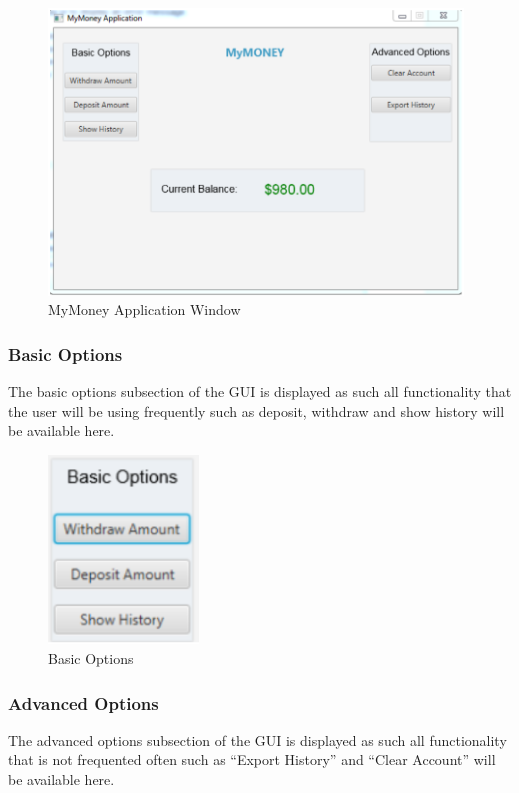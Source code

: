 \documentclass[12pt]{article}
\begin{document}
\begin{figure}[h!]
  \centering
  \includegraphics[width=110mm]{maininterface.PNG}
  \caption{MyMoney Application Window}
\end{figure}


\subsubsection{Basic Options}
The basic options subsection of the GUI is displayed as such all functionality that the user will be using frequently such as deposit, withdraw and show history will be available here.

\begin{figure}[h!]
  \centering
  \includegraphics[width=40mm]{basicoption.PNG}
  \caption{Basic Options}
\end{figure}

\subsubsection{Advanced Options}
The advanced options subsection of the GUI is displayed as such all functionality that is not frequented often such as “Export History” and “Clear Account” will be available here.
\end{document}
